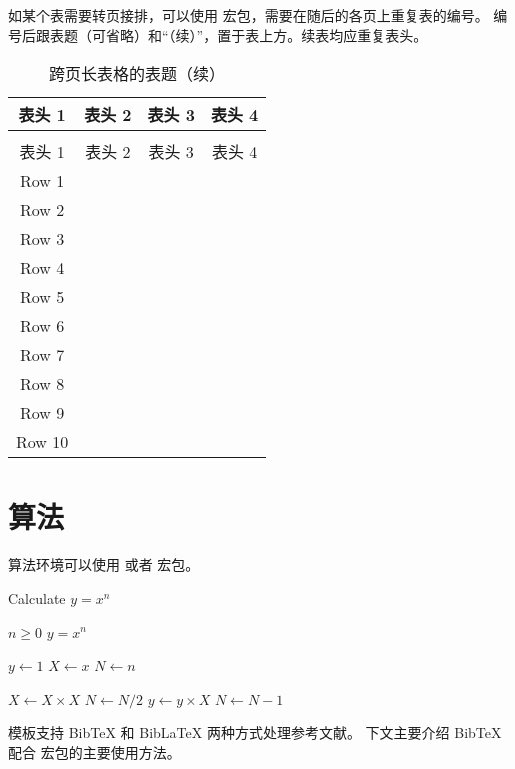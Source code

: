 如某个表需要转页接排，可以使用  宏包，需要在随后的各页上重复表的编号。
编号后跟表题（可省略）和“（续）”，置于表上方。续表均应重复表头。

\begin{longtable}{cccc}
	\caption{跨页长表格的表题} \\
	\toprule
	表头 1 & 表头 2 & 表头 3 & 表头 4 \\
	\midrule
	\endfirsthead
	\caption[]{跨页长表格的表题（续）} \\
	\toprule
	表头 1 & 表头 2 & 表头 3 & 表头 4 \\
	\midrule
	\endhead
	\bottomrule
	\endfoot
	Row 1  & & & \\
	Row 2  & & & \\
	Row 3  & & & \\
	Row 4  & & & \\
	Row 5  & & & \\
	Row 6  & & & \\
	Row 7  & & & \\
	Row 8  & & & \\
	Row 9  & & & \\
	Row 10 & & & \\
\end{longtable}



\section{算法}

算法环境可以使用  或者  宏包。

\renewcommand{\algorithmicrequire}{\textbf{输入：}\unskip}
\renewcommand{\algorithmicensure}{\textbf{输出：}\unskip}

\begin{algorithm}
	\caption{Calculate $y = x^n$}
	\label{alg1}
	\small
	\begin{algorithmic}
		\REQUIRE $n \geq 0$
		\ENSURE $y = x^n$
		
		\STATE $y \leftarrow 1$
		\STATE $X \leftarrow x$
		\STATE $N \leftarrow n$
		
		\STATE $X \leftarrow X \times X$
		\STATE $N \leftarrow N / 2$
		\ELSE[$N$ is odd]
		\STATE $y \leftarrow y \times X$
		\STATE $N \leftarrow N - 1$
		\ENDIF
		\ENDWHILE
	\end{algorithmic}
\end{algorithm}


模板支持 BibTeX 和 BibLaTeX 两种方式处理参考文献。
下文主要介绍 BibTeX 配合  宏包的主要使用方法。


